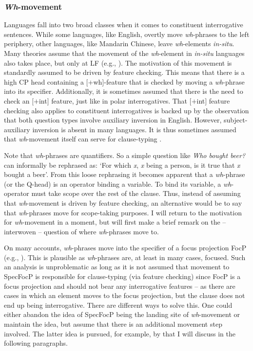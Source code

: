 \subsubsection{\textit{Wh}-movement}
Languages fall into two broad classes when it comes to constituent interrogative sentences. While some languages, like English, overtly move \textit{wh}-phrases to the left periphery, other languages, like Mandarin Chinese, leave \textit{wh}-elements \textit{in-situ}. Many theories assume that the movement of the \textit{wh}-element in \textit{in-situ} languages also takes place, but only at LF (e.g., \citealt{rizzi1990relativized,cheng1997typology}). The motivation of this movement is standardly assumed to be driven by feature checking. This means that there is a high CP head containing a $[+$wh$]$-feature that is checked by moving a \textit{wh}-phrase into its specifier. Additionally, it is sometimes assumed that there is the need to check an $[+$int$]$ feature, just like in polar interrogatives. That $[+$int$]$ feature checking also applies to constituent interrogatives is backed up by the observation that both question types involve auxiliary inversion in English. However, subject-auxiliary inversion is absent in many languages. It is thus sometimes assumed that \textit{wh}-movement itself can serve for clause-typing \citep{cheng1997typology}.

Note that \textit{wh}-phrases are quantifiers. So a simple question like \textit{Who bought beer?} can informally be rephrased as: `For which \textit{x}, \textit{x} being a person, is it true that \textit{x} bought a beer'. From this loose rephrasing it becomes apparent that a \textit{wh}-phrase (or the Q-head) is an operator binding a variable. To bind its variable, a \textit{wh}-operator must take scope over the rest of the clause. Thus, instead of assuming that \textit{wh}-movement is driven by feature checking, an alternative would be to say that \textit{wh}-phrases move for scope-taking purposes. I will return to the motivation for \textit{wh}-movement in a moment, but will first make a brief remark on the -- interwoven -- question of where \textit{wh}-phrases move to.

\label{abohpfaua}
On many accounts, \textit{wh}-phrases move into the specifier of a focus projection FocP (e.g., \citealt{rizzi2001position}). This is plausible as \textit{wh}-phrases are, at least in many cases, focused. Such an analysis is unproblematic as long as it is not assumed that movement to SpecFocP is responsible for clause-typing (via feature checking) since FocP is a focus projection and should not bear any interrogative features -- as there are cases in which an element moves to the focus projection, but the clause does not end up being interrogative. There are different ways to solve this. One could either abandon the idea of SpecFocP being the landing site of \textit{wh}-movement or maintain the idea, but assume that there is an additional movement step involved. The latter idea is pursued, for example, by \citet{aboh2010sa} that I will discuss in the following paragraphs.

